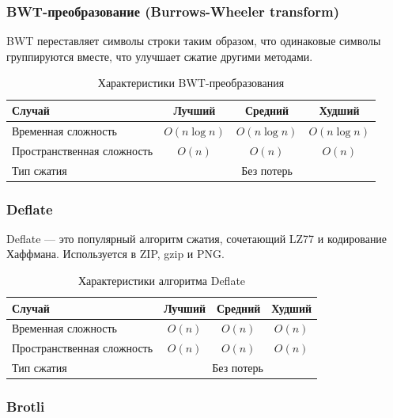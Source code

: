 \documentclass[a4paper,12pt]{article}
\begin{document}
\subsubsection{BWT-преобразование (Burrows-Wheeler transform)}
\label{subsubsec:bwt-преобразование-burrows-wheeler-transform}

BWT переставляет символы строки таким образом, что одинаковые символы группируются вместе, что улучшает сжатие другими методами.

\begin{table}[H]
    \centering
    \begin{tabular}{|l|c|c|c|}
        \hline
        Случай & Лучший & Средний & Худший \\
        \hline
        Временная сложность & $O(n \log n)$ & $O(n \log n)$ & $O(n \log n)$ \\
        \hline
        Пространственная сложность & $O(n)$ & $O(n)$ & $O(n)$ \\
        \hline
        Тип сжатия & \multicolumn{3}{c|}{Без потерь} \\
        \hline
    \end{tabular}
    \caption{Характеристики BWT-преобразования}
\end{table}

\subsubsection{Deflate}
\label{subsubsec:deflate}

Deflate --- это популярный алгоритм сжатия, сочетающий LZ77 и кодирование Хаффмана. Используется в ZIP, gzip и PNG.

\begin{table}[H]
    \centering
    \begin{tabular}{|l|c|c|c|}
        \hline
        Случай & Лучший & Средний & Худший \\
        \hline
        Временная сложность & $O(n)$ & $O(n)$ & $O(n)$ \\
        \hline
        Пространственная сложность & $O(n)$ & $O(n)$ & $O(n)$ \\
        \hline
        Тип сжатия & \multicolumn{3}{c|}{Без потерь} \\
        \hline
    \end{tabular}
    \caption{Характеристики алгоритма Deflate}
\end{table}

\subsubsection{Brotli}
\label{subsubsec:brotli}
\end{document}
